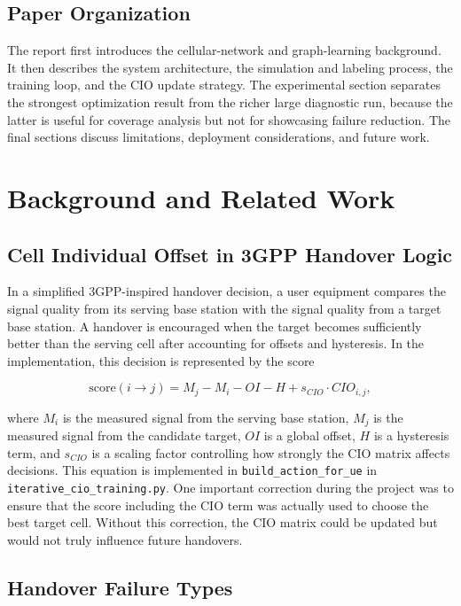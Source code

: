 \documentclass[11pt, a4paper, twoside]{article}
\begin{document}
\subsection{Paper Organization}

The report first introduces the cellular-network and graph-learning background. It then describes the system architecture, the simulation and labeling process, the training loop, and the CIO update strategy. The experimental section separates the strongest optimization result from the richer large diagnostic run, because the latter is useful for coverage analysis but not for showcasing failure reduction. The final sections discuss limitations, deployment considerations, and future work.

\section{Background and Related Work}
\label{sec:background}

\subsection{Cell Individual Offset in 3GPP Handover Logic}

In a simplified 3GPP-inspired handover decision, a user equipment compares the signal quality from its serving base station with the signal quality from a target base station. A handover is encouraged when the target becomes sufficiently better than the serving cell after accounting for offsets and hysteresis. In the implementation, this decision is represented by the score

\begin{equation}
\text{score}(i \to j) = M_j - M_i - OI - H + s_{CIO} \cdot CIO_{i,j},
\end{equation}

where $M_i$ is the measured signal from the serving base station, $M_j$ is the measured signal from the candidate target, $OI$ is a global offset, $H$ is a hysteresis term, and $s_{CIO}$ is a scaling factor controlling how strongly the CIO matrix affects decisions. This equation is implemented in \texttt{build\_action\_for\_ue} in \texttt{iterative\_cio\_training.py}. One important correction during the project was to ensure that the score including the CIO term was actually used to choose the best target cell. Without this correction, the CIO matrix could be updated but would not truly influence future handovers.

\subsection{Handover Failure Types}
\end{document}

